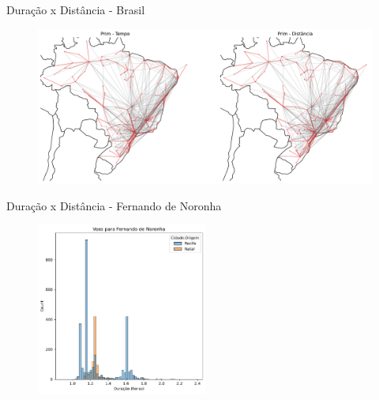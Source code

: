 \documentclass[aspectratio=169,usenames,dvipsnames]{beamer}
\begin{document}
\begin{frame}{Duração x Distância - Brasil}
    \begin{figure}[ht]
        \centering
        \includegraphics[width=\textwidth]{figs/brasil_time_x_distance_mst_1.pdf}
    \end{figure}
\end{frame}

\begin{frame}{Duração x Distância - Fernando de Noronha}
    \begin{figure}[ht]
        \centering
        \includegraphics[width=0.5\textwidth]{figs/histograma_fernando_noronha.pdf}
    \end{figure}
\end{frame}
\end{document}
